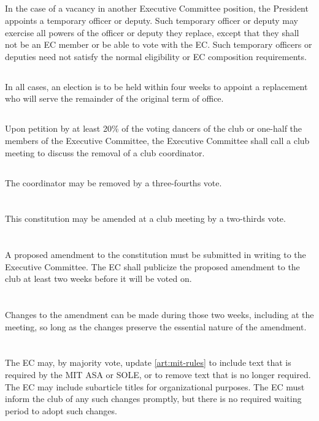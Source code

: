 \documentclass{bylaws}
\begin{document}
\subsection{}In the case of a vacancy in another Executive Committee position, the President appoints a temporary officer or deputy. Such temporary officer or deputy may exercise all powers of the officer or deputy they replace, except that they shall not be an EC member or be able to vote with the EC. Such temporary officers or deputies need not satisfy the normal eligibility or EC composition requirements.
\subsection{}In all cases, an election is to be held within four weeks to appoint a replacement who will serve the remainder of the original term of office.

\subsection{}Upon petition by at least 20\% of the voting dancers of the club or one-half the members of the Executive Committee, the Executive Committee shall call a club meeting to discuss the removal of a club coordinator.
\subsection{}The coordinator may be removed by a three-fourths vote.


\section{}This constitution may be amended at a club meeting by a two-thirds vote.
\section{}A proposed amendment to the constitution must be submitted in writing to the Executive Committee. The EC shall publicize the proposed amendment to the club at least two weeks before it will be voted on.
\section{}Changes to the amendment can be made during those two weeks, including at the meeting, so long as the changes preserve the essential nature of the amendment.
\section{}The EC may, by majority vote, update \ref{art:mit-rules} to include text that is required by the MIT ASA or SOLE, or to remove text that is no longer required. The EC may include subarticle titles for organizational purposes. The EC must inform the club of any such changes promptly, but there is no required waiting period to adopt such changes.
\end{document}
